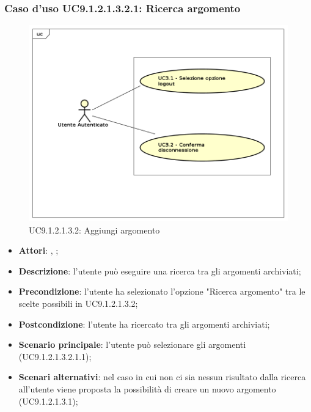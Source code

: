 							\subsubsection{Caso d'uso UC9.1.2.1.3.2.1: Ricerca argomento}
							\label{UC9.1.2.1.3.2.1}
							\begin{figure}[h]
								\centering
								\includegraphics[scale=0.7,keepaspectratio]{UML/UC9.png}
								\caption{UC9.1.2.1.3.2: Aggiungi argomento}
							\end{figure}
							\FloatBarrier
							\begin{itemize}
								\item \textbf{Attori}: \uau, \uaupro;
								\item \textbf{Descrizione}: l'utente può eseguire una ricerca tra gli argomenti archiviati; 
								\item \textbf{Precondizione}: l'utente ha selezionato l'opzione "Ricerca argomento" tra le scelte possibili in UC9.1.2.1.3.2;
								\item \textbf{Postcondizione}: l'utente ha ricercato tra gli argomenti archiviati;
								\item \textbf{Scenario principale}: l'utente può selezionare gli argomenti (UC9.1.2.1.3.2.1.1); 
								\item \textbf{Scenari alternativi}: nel caso in cui non ci sia nessun risultato dalla ricerca all'utente viene proposta la possibilità di creare un nuovo argomento (UC9.1.2.1.3.1);
							\end{itemize}
							
